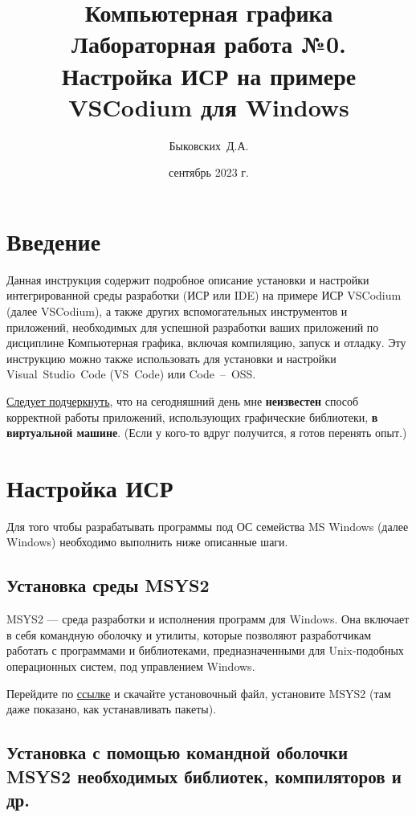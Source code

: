 \documentclass[a4paper,12pt]{article}
\author{Быковских~Д.А.}
\title{
    Компьютерная графика \\ 
    Лабораторная работа №0. \\ 
    Настройка ИСР на примере VSCodium для Windows
    }
\date{сентябрь 2023 г.}
\begin{document}
        
\fontsize{14pt}{16pt}\selectfont

    \maketitle

   \section{Введение}
        Данная инструкция содержит подробное описание установки и настройки интегрированной среды разработки (ИСР или IDE) на примере ИСР VSCodium (далее VSCodium), а также других вспомогательных инструментов и приложений, необходимых для успешной разработки ваших приложений по дисциплине \textquotedbl Компьютерная графика\textquotedbl, включая компиляцию, запуск и отладку. Эту инструкцию можно также использовать для установки и настройки Visual~Studio~Code (VS~Code) или Code~--~OSS.
        
        \underline{Следует подчеркнуть}, что на сегодняшний день мне \textbf{неизвестен} способ корректной работы приложений, использующих графические библиотеки, \textbf{в виртуальной машине}. (Если у кого-то вдруг получится, я готов перенять опыт.)
        
    \section{Настройка ИСР}

        Для того чтобы разрабатывать программы под ОС семейства MS Windows (далее Windows) необходимо выполнить ниже описанные шаги.
        
        \subsection{Установка среды MSYS2}

        MSYS2 --- среда разработки и исполнения программ для Windows. Она включает в себя командную оболочку и утилиты, которые позволяют разработчикам работать с программами и библиотеками, предназначенными для Unix-подобных операционных систем, под управлением Windows.

        Перейдите по \href{https://www.msys2.org/}{ссылке} и скачайте установочный файл, установите MSYS2 (там даже показано, как устанавливать пакеты).
    
        
        \subsection{Установка с помощью командной оболочки MSYS2 необходимых библиотек, компиляторов и др.}
\end{document}
